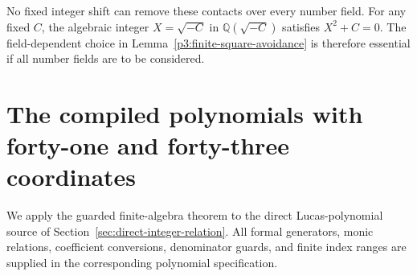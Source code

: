 \documentclass[11pt]{article}
\theoremstyle{definition}
\begin{document}
No fixed integer shift can remove these contacts over every number
field. For any fixed $C$, the algebraic integer $X=\sqrt{-C}$ in
$\mathbb Q(\sqrt{-C})$ satisfies $X^2+C=0$. The field-dependent
choice in Lemma~\ref{p3:finite-square-avoidance} is therefore
essential if all number fields are to be considered.


\section{The compiled polynomials with forty-one and forty-three coordinates}
\label{sec:p3-compiled-polynomials}

We apply the guarded finite-algebra theorem to the direct
Lucas-polynomial source of Section~\ref{sec:direct-integer-relation}.
All formal generators, monic relations, coefficient conversions,
denominator guards, and finite index ranges are supplied in the
corresponding polynomial specification.
\end{document}
